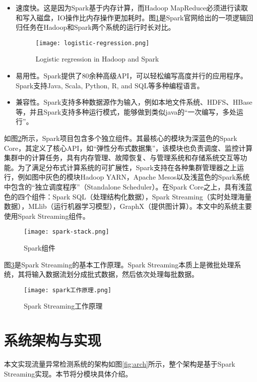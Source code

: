 \begin{itemize}
  \item 速度快。这是因为Spark基于内存计算，而Hadoop MapReduce必须进行读取和写入磁盘，IO操作比内存操作更加耗时。图\ref{fig:Logistic regression in Hadoop and Spark}是Spark官网给出的一项逻辑回归任务在Hadoop和Spark两个系统的运行时长对比。
   \begin{figure}
    \centering
    \texttt{[image: logistic-regression.png]}
    \caption{Logistic regression in Hadoop and Spark}
    \label{fig:Logistic regression in Hadoop and Spark}
  \end{figure}
  \item 易用性。Spark提供了80余种高级API，可以轻松编写高度并行的应用程序。Spark支持Java, Scala, Python, R, and SQL等多种编程语言。
  \item 兼容性。Spark支持多种数据源作为输入，例如本地文件系统、HDFS、HBase等，并且Spark支持多种运行模式，能够做到类似java的“一次编写，多处运行”。
\end{itemize}



如图\ref{fig:Spark组件}所示，Spark项目包含多个独立组件。其最核心的模块为深蓝色的Spark Core，其定义了核心API，如“弹性分布式数据集”，该模块也负责调度、监控计算集群中的计算任务，具有内存管理、故障恢复、与管理系统和存储系统交互等功能。为了满足分布式计算系统的可扩展性，Spark支持在各种集群管理器之上运行，例如图中灰色的模块Hadoop YARN，Apache Mesos以及浅蓝色的Spark系统中包含的“独立调度程序”（Standalone Scheduler）。在Spark Core之上，具有浅蓝色的四个组件：Spark SQL（处理结构化数据），Spark Streaming（实时处理海量数据），MLlib（运行机器学习模型），GraphX（提供图计算）。本文中的系统主要使用Spark Streaming组件。



\begin{figure}
  \centering
  \texttt{[image: spark-stack.png]}
  \caption{Spark组件}
  \label{fig:Spark组件}
\end{figure}

图\ref{fig:spark工作原理}是Spark Streaming的基本工作原理\cite{spark}。Spark Streaming本质上是微批处理系统，其将输入数据流划分成批式数据，然后依次处理每批数据。
\begin{figure}
  \centering
  \texttt{[image: spark工作原理.png]}
  \caption{Spark Streaming工作原理}
  \label{fig:spark工作原理}
\end{figure}

\section{系统架构与实现}
本文实现流量异常检测系统的架构如图\ref{fig:arch}所示，整个架构是基于Spark Streaming实现。本节将分模块具体介绍。
